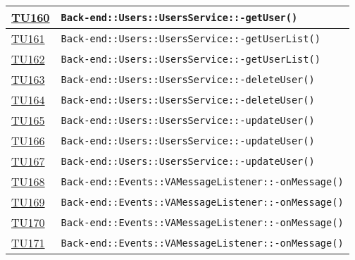 \begin{longtable}{|>{\centering}m{1cm}|m{12cm}<{\centering}|}
\hyperlink{TU160}{TU160} & \texttt{Back-end::Users::UsersService::-\linebreak getUser()}\\ \hline

\hyperlink{TU161}{TU161} & \texttt{Back-end::Users::UsersService::-\linebreak getUserList()}\\ \hline

\hyperlink{TU162}{TU162} & \texttt{Back-end::Users::UsersService::-\linebreak getUserList()}\\ \hline

\hyperlink{TU163}{TU163} & \texttt{Back-end::Users::UsersService::-\linebreak deleteUser()}\\ \hline

\hyperlink{TU164}{TU164} & \texttt{Back-end::Users::UsersService::-\linebreak deleteUser()}\\ \hline

\hyperlink{TU165}{TU165} & \texttt{Back-end::Users::UsersService::-\linebreak updateUser()}\\ \hline

\hyperlink{TU166}{TU166} & \texttt{Back-end::Users::UsersService::-\linebreak updateUser()}\\ \hline

\hyperlink{TU167}{TU167} & \texttt{Back-end::Users::UsersService::-\linebreak updateUser()}\\ \hline

\hyperlink{TU168}{TU168} & \texttt{Back-end::Events::VAMessageListener::-\linebreak onMessage()}\\ \hline

\hyperlink{TU169}{TU169} & \texttt{Back-end::Events::VAMessageListener::-\linebreak onMessage()}\\ \hline

\hyperlink{TU170}{TU170} & \texttt{Back-end::Events::VAMessageListener::-\linebreak onMessage()}\\ \hline

\hyperlink{TU171}{TU171} & \texttt{Back-end::Events::VAMessageListener::-\linebreak onMessage()}\\ \hline


\end{longtable}
